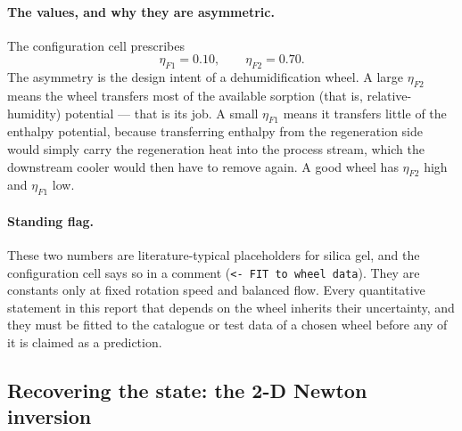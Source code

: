 \paragraph{The values, and why they are asymmetric.}
The configuration cell prescribes
\begin{equation}
\eta_{F1}=0.10,\qquad \eta_{F2}=0.70 .
\label{eq:dw:etavals}
\end{equation}
The asymmetry is the design intent of a dehumidification wheel. A large
$\eta_{F2}$ means the wheel transfers most of the available sorption (that
is, relative-humidity) potential --- that is its job. A small $\eta_{F1}$
means it transfers little of the enthalpy potential, because transferring
enthalpy from the regeneration side would simply carry the regeneration heat
into the process stream, which the downstream cooler would then have to
remove again. A good wheel has $\eta_{F2}$ high and $\eta_{F1}$ low.

\paragraph{Standing flag.} These two numbers are literature-typical
placeholders for silica gel, and the configuration cell says so in a comment
(\texttt{<- FIT to wheel data}). They are constants only at fixed rotation
speed and balanced flow. Every quantitative statement in this report that
depends on the wheel inherits their uncertainty, and they must be fitted to
the catalogue or test data of a chosen wheel before any of it is claimed as a
prediction.

\subsection{Recovering the state: the 2-D Newton inversion}
\label{sec:dw:newton}

